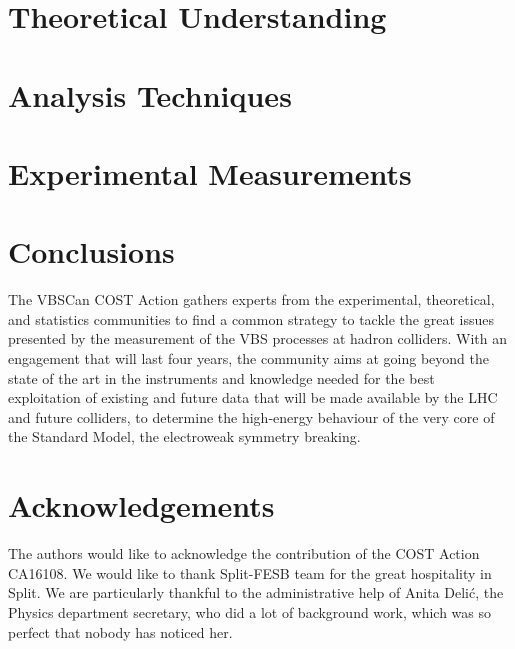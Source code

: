 \documentclass[12pt]{article}
\begin{document}
\section{Theoretical Understanding}



\section{Analysis Techniques}



\section{Experimental Measurements}



\section*{Conclusions}

The VBSCan COST Action
gathers experts from the experimental, theoretical, and statistics communities
to find a common strategy to tackle the great issues presented
by the measurement of the VBS processes at hadron colliders.
With an engagement that will last four years,
the community aims at going beyond the state of the art
in the instruments and knowledge needed for the best exploitation
of existing and future data 
that will be made available by the LHC and future colliders,
to determine the high-energy behaviour of the very core of the Standard Model,
the electroweak symmetry breaking.

\section*{Acknowledgements}

The authors would like to acknowledge the contribution of the COST Action CA16108.
We would like to thank Split-FESB team for the great hospitality in Split. 
We are particularly thankful to the administrative help of Anita Deli\'c, 
the Physics department secretary,
who did a lot of background work, 
which was so perfect that nobody has noticed her.

%
% 

\printbibliography
\end{document}
